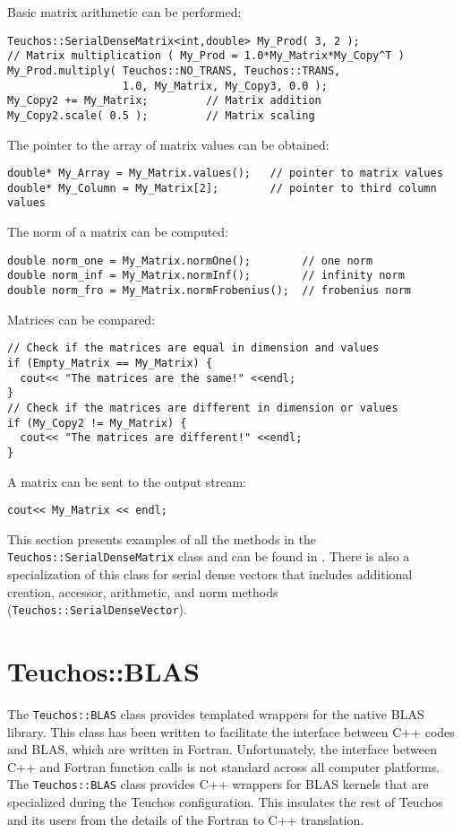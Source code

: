 Basic matrix arithmetic can be performed:
{\small
\begin{verbatim}
Teuchos::SerialDenseMatrix<int,double> My_Prod( 3, 2 );
// Matrix multiplication ( My_Prod = 1.0*My_Matrix*My_Copy^T )
My_Prod.multiply( Teuchos::NO_TRANS, Teuchos::TRANS, 
                  1.0, My_Matrix, My_Copy3, 0.0 );
My_Copy2 += My_Matrix;         // Matrix addition
My_Copy2.scale( 0.5 );         // Matrix scaling
\end{verbatim}}
The pointer to the array of matrix values can be obtained:
{\small
\begin{verbatim}
double* My_Array = My_Matrix.values();   // pointer to matrix values
double* My_Column = My_Matrix[2];        // pointer to third column values
\end{verbatim}}
The norm of a matrix can be computed:
{\small
\begin{verbatim}
double norm_one = My_Matrix.normOne();        // one norm
double norm_inf = My_Matrix.normInf();        // infinity norm
double norm_fro = My_Matrix.normFrobenius();  // frobenius norm
\end{verbatim}}
Matrices can be compared:
{\small
\begin{verbatim}
// Check if the matrices are equal in dimension and values
if (Empty_Matrix == My_Matrix) {
  cout<< "The matrices are the same!" <<endl;
}
// Check if the matrices are different in dimension or values
if (My_Copy2 != My_Matrix) {
  cout<< "The matrices are different!" <<endl;
}
\end{verbatim}}
A matrix can be sent to the output stream:
{\small
\begin{verbatim}
cout<< My_Matrix << endl;
\end{verbatim}}
This section presents examples of all the methods in the 
{\tt Teuchos::SerialDenseMatrix} class and can be found in
.  There is also a specialization of
this class for serial dense vectors that includes additional creation, accessor, 
arithmetic, and norm methods ({\tt Teuchos::SerialDenseVector}).


\section{Teuchos::BLAS}
\label{sec:teuchos:BLAS}

The \verb!Teuchos::BLAS! class provides templated wrappers for the native BLAS library.
This class has been written to facilitate the interface between C++ codes and BLAS,
which are written in Fortran.  Unfortunately, the interface between C++ and Fortran
function calls is not standard across all computer platforms.  The \verb!Teuchos::BLAS!
class provides C++ wrappers for BLAS kernels that are specialized during the Teuchos
configuration.  This insulates the rest of Teuchos and its users from the details of
the Fortran to C++ translation.

